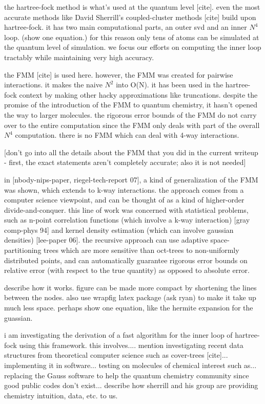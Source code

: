 \documentclass[twoside,leqno, 12pt]{article}
\begin{document}
the hartree-fock method is what's used at the quantum level [cite].
even the most accurate methods like David Sherrill's coupled-cluster
methods [cite] build upon hartree-fock.  it has two main computational 
parts, an outer svd and an inner $N^4$ loop.  (show one equation.) for
this reason only tens of atoms can be simulated at the quantum level
of simulation.  we focus our efforts on computing the inner loop
tractably while maintaining very high accuracy.

the FMM [cite] is used here.  however, the FMM was created for
pairwise interactions.  it makes the naive $N^2$ into O(N).  it has been
used in the hartree-fock context by making other hacky approximations
like truncations.  despite the promise of the introduction of the FMM 
to quantum chemistry, it hasn't opened the way to larger molecules.  the
rigorous error bounds of the FMM do not carry over to the entire computation
since the FMM only deals with part of the overall $N^4$ computation.  there 
is no FMM which can deal with 4-way interactions.

[don't go into all the details about the FMM that you did in the current
writeup - first, the exact statements aren't completely accurate; also 
it is not needed]

in [nbody-nips-paper, riegel-tech-report 07], a kind of generalization
of the FMM was shown, which extends to k-way interactions.  the
approach comes from a computer science viewpoint, and can be thought
of as a kind of higher-order divide-and-conquer.  this line of work 
was concerned with statistical problems, such as n-point correlation
functions (which involve a k-way interaction) [gray comp-phys 94] and
kernel density estimation (which can involve gaussian densities)
[lee-paper 06].  the recursive approach can use adaptive 
space-partitioning trees which are more sensitive than oct-trees to
non-uniformly distributed points, and can automatically guarantee
rigorous error bounds on relative error (with respect to the true
quantity) as opposed to absolute error.

describe how it works.  figure can be made more compact by shortening
the lines between the nodes.  also use wrapfig latex package (ask ryan) to 
make it take up much less space.  perhaps show one equation, like the 
hermite expansion for the guassian. %
 
i am investigating the derivation of a fast algorithm for the inner
loop of hartree-fock using this framework.  this involves....  mention
investigating recent data structures from theoretical computer science
such as cover-trees [cite]...  implementing it in software...  testing
on molecules of chemical interest such as...  replacing the Gauss
software to help the quantum chemistry community since good public
codes don't exist...  describe how sherrill and his group are 
providing chemistry intuition, data, etc. to us.
\end{document}

